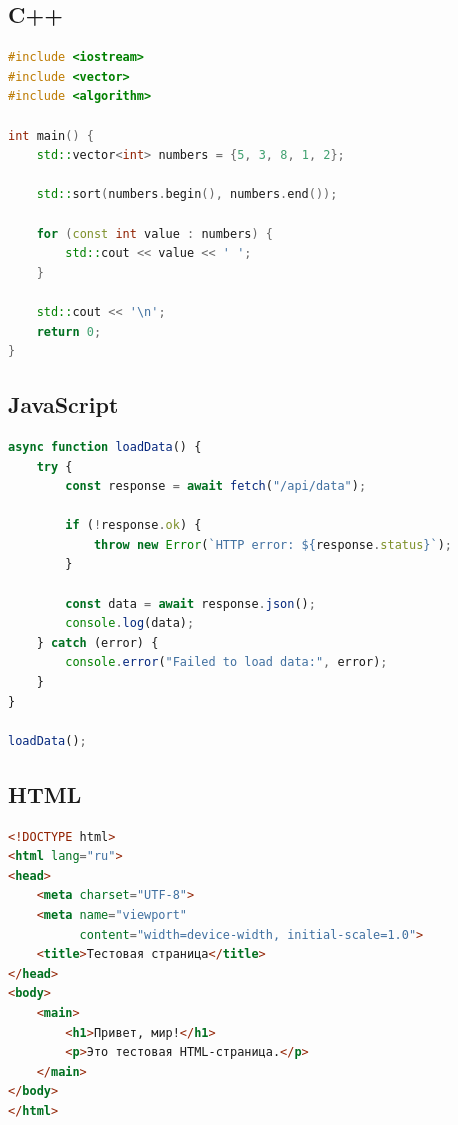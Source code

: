 \documentclass[12pt,a4paper]{article}
\theoremstyle{definition}
\theoremstyle{remark}
\begin{document}
\subsection{C++}

\begin{lstlisting}[language=C++, caption={Пример программы на C++}]
#include <iostream>
#include <vector>
#include <algorithm>

int main() {
    std::vector<int> numbers = {5, 3, 8, 1, 2};

    std::sort(numbers.begin(), numbers.end());

    for (const int value : numbers) {
        std::cout << value << ' ';
    }

    std::cout << '\n';
    return 0;
}
\end{lstlisting}

\subsection{JavaScript}

\begin{lstlisting}[language=JavaScript, caption={Асинхронный запрос}]
async function loadData() {
    try {
        const response = await fetch("/api/data");

        if (!response.ok) {
            throw new Error(`HTTP error: ${response.status}`);
        }

        const data = await response.json();
        console.log(data);
    } catch (error) {
        console.error("Failed to load data:", error);
    }
}

loadData();
\end{lstlisting}

\subsection{HTML}

\begin{lstlisting}[language=HTML, caption={Простая HTML-страница}]
<!DOCTYPE html>
<html lang="ru">
<head>
    <meta charset="UTF-8">
    <meta name="viewport"
          content="width=device-width, initial-scale=1.0">
    <title>Тестовая страница</title>
</head>
<body>
    <main>
        <h1>Привет, мир!</h1>
        <p>Это тестовая HTML-страница.</p>
    </main>
</body>
</html>
\end{lstlisting}

\end{document}
